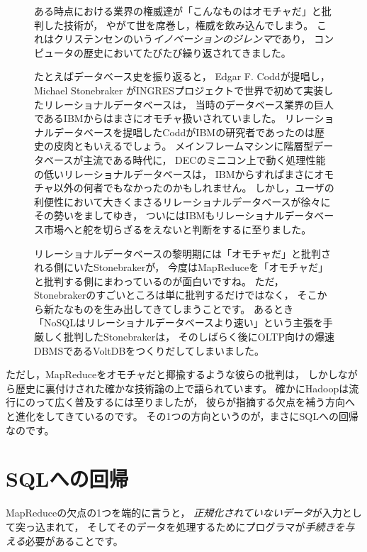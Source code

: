 \begin{figure}[t]
\begin{screen}
 \vspace*{3mm}

 ある時点における業界の権威達が「こんなものはオモチャだ」と批判した技術が，
 やがて世を席巻し，権威を飲み込んでしまう。
 これはクリステンセンのいう{\em イノベーションのジレンマ}であり，
 コンピュータの歴史においてたびたび繰り返されてきました。

 たとえばデータベース史を振り返ると，
 Edgar F. Coddが提唱し，
 Michael Stonebraker がINGRESプロジェクトで世界で初めて実装したリレーショナルデータベースは，
 当時のデータベース業界の巨人であるIBMからはまさにオモチャ扱いされていました。
 リレーショナルデータベースを提唱したCoddがIBMの研究者であったのは歴史の皮肉ともいえるでしょう。
 メインフレームマシンに階層型データベースが主流である時代に，
 DECのミニコン上で動く処理性能の低いリレーショナルデータベースは，
 IBMからすればまさにオモチャ以外の何者でもなかったのかもしれません。
 しかし，ユーザの利便性において大きくまさるリレーショナルデータベースが徐々にその勢いをましてゆき，
 ついにはIBMもリレーショナルデータベース市場へと舵を切らざるをえないと判断をするに至りました。

 リレーショナルデータベースの黎明期には「オモチャだ」と批判される側にいたStonebrakerが，
 今度はMapReduceを「オモチャだ」と批判する側にまわっているのが面白いですね。
 ただ，Stonebrakerのすごいところは単に批判するだけではなく，
 そこから新たなものを生み出してきてしまうことです。
 あるとき「NoSQLはリレーショナルデータベースより速い」という主張を手厳しく批判したStonebrakerは，
 そのしばらく後にOLTP向けの爆速DBMSであるVoltDBをつくりだしてしまいました。
\end{screen}
\end{figure}

ただし，MapReduceをオモチャだと揶揄するような彼らの批判は，
しかしながら歴史に裏付けされた確かな技術論の上で語られています。
確かにHadoopは流行にのって広く普及するには至りましたが，
彼らが指摘する欠点を補う方向へと進化をしてきているのです。
その1つの方向というのが，まさにSQLへの回帰なのです。

\section{SQLへの回帰}

MapReduceの欠点の1つを端的に言うと，
{\em 正規化されていないデータ}が入力として突っ込まれて，
そしてそのデータを処理するためにプログラマが{\em 手続きを与える}必要があることです。

